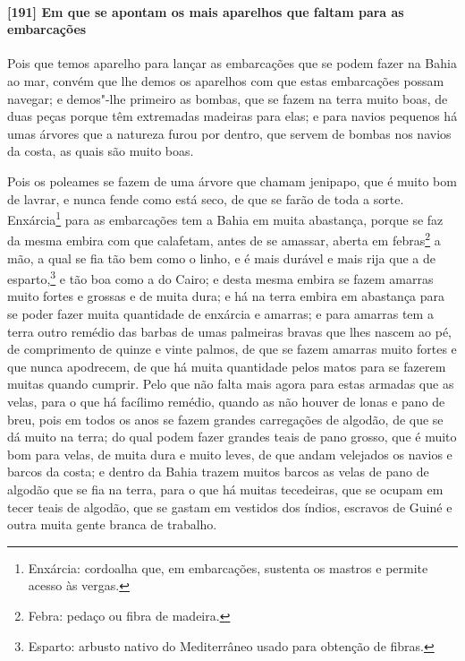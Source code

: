\begin{linenumbers}
\paragraph{[191] Em que se apontam os mais aparelhos que faltam para as embarcações}\quad
Pois que temos aparelho para lançar as embarcações que se podem fazer na Bahia ao mar,
convém que lhe demos os aparelhos com que estas embarcações possam navegar; e demos"-lhe
primeiro as bombas, que se fazem na terra muito boas, de duas peças porque têm extremadas
madeiras para elas; e para navios pequenos há umas árvores que a natureza furou por
dentro, que servem de bombas nos navios da costa, as quais são muito boas.

Pois os poleames se fazem de uma árvore que chamam jenipapo, que é muito bom de lavrar, e
nunca fende como está seco, de que se farão de toda a sorte. Enxárcia\footnote{ Enxárcia:
cordoalha que, em embarcações, sustenta os mastros e permite acesso às vergas.} para as
embarcações tem a Bahia em muita abastança, porque se faz da mesma embira com que
calafetam, antes de se amassar, aberta em febras\footnote{ Febra: pedaço ou fibra de
madeira.} a mão, a qual se fia tão bem como o linho, e é mais durável e mais rija que a de
esparto,\footnote{ Esparto: arbusto nativo do Mediterrâneo usado para obtenção de fibras.}
e tão boa como a do Cairo; e desta mesma embira se fazem amarras muito fortes e grossas e
de muita dura; e há na terra embira em abastança para se poder fazer muita quantidade de
enxárcia e amarras; e para amarras tem a terra outro remédio das barbas de umas palmeiras
bravas que lhes nascem ao pé, de comprimento de quinze e vinte palmos, de que se fazem
amarras muito fortes e que nunca apodrecem, de que há muita quantidade pelos matos para se
fazerem muitas quando cumprir. Pelo que não falta mais agora para estas armadas que as
velas, para o que há facílimo remédio, quando as não houver de lonas e pano de breu, pois
em todos os anos se fazem grandes carregações de algodão, de que se dá muito na terra; do
qual podem fazer grandes teais de pano grosso, que é muito bom para velas, de muita dura e
muito leves, de que andam velejados os navios e barcos da costa; e dentro da Bahia trazem
muitos barcos as velas de pano de algodão que se fia na terra, para o que há muitas
tecedeiras, que se ocupam em tecer teais de algodão, que se gastam em vestidos dos índios,
escravos de Guiné e outra muita gente branca de trabalho.


\end{linenumbers}

